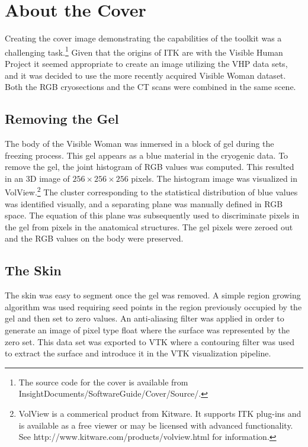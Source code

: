\section*{About the Cover}

Creating the cover image demonstrating the capabilities of the toolkit was a
challenging task.\footnote{The source code for the cover is available from
InsightDocuments/SoftwareGuide/Cover/Source/.} Given that the origins of ITK
are with the Visible Human Project it seemed appropriate to create an image
utilizing the VHP data sets, and it was decided to use the more recently
acquired Visible Woman dataset.  Both the RGB cryosections and the CT scans
were combined in the same scene.

\subsection*{Removing the Gel}

The body of the Visible Woman was inmersed in a block of gel during the
freezing process. This gel appears as a blue material in the cryogenic data.
To remove the gel, the joint histogram of RGB values was computed. This
resulted in an 3D image of $256\times256\times256$ pixels. The histogram
image was visualized in VolView.\footnote{VolView is a commerical product
from Kitware. It supports ITK plug-ins and is available as a free viewer or
may be licensed with advanced functionality. See
http://www.kitware.com/products/volview.html for information.} The cluster
corresponding to the statistical distribution of blue values was identified
visually, and a separating plane was manually defined in RGB space. The
equation of this plane was subsequently used to discriminate pixels in the
gel from pixels in the anatomical structures. The gel pixels were zeroed out
and the RGB values on the body were preserved.

\subsection*{The Skin}

The skin was easy to segment once the gel was removed. A simple region
growing algorithm was used requiring seed points in the region previously
occupied by the gel and then set to zero values. An anti-aliasing filter was
applied in order to generate an image of pixel type float where the surface
was represented by the zero set. This data set was exported to VTK where a
contouring filter was used to extract the surface and introduce it in the VTK
visualization pipeline.

